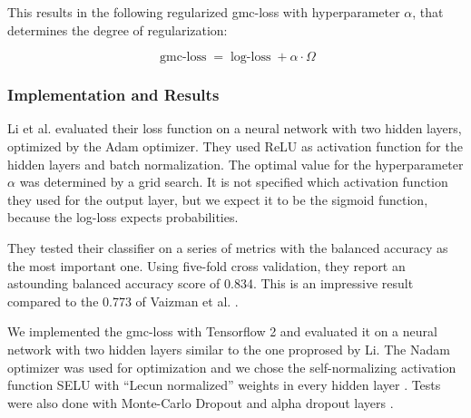 This results in the following regularized gmc-loss with hyperparameter $\alpha$, that determines the degree of regularization:

\begin{equation}
	\operatorname{gmc-loss} = \operatorname{log-loss} + \alpha \cdot \Omega
\end{equation}

\subsubsection{Implementation and Results}

Li et al. evaluated their loss function on a neural network with two hidden layers, optimized by the Adam optimizer. They used ReLU as activation function for the hidden layers and batch normalization. The optimal value for the hyperparameter $\alpha$ was determined by a grid search. It is not specified which activation function they used for the output layer, but we expect it to be the sigmoid function, because the log-loss expects probabilities.

They tested their classifier on a series of metrics with the balanced accuracy as the most important one. Using five-fold cross validation, they report an astounding balanced accuracy score of 0.834. This is an impressive result compared to the 0.773 of Vaizman et al. \cite{Vaizman18}.

We implemented the gmc-loss with Tensorflow 2 and evaluated it on a neural network with two hidden layers similar to the one proprosed by Li. The Nadam optimizer was used for optimization \cite{Dozat2015} and we chose the self-normalizing activation function SELU with \enquote{Lecun normalized} weights in every hidden layer \cite{Klambauer17}. Tests were also done with Monte-Carlo Dropout and alpha dropout layers \cite{Gal2016}.

